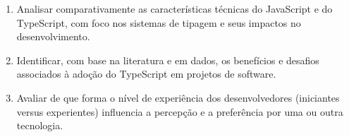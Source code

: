 \begin{enumerate}
    \item Analisar comparativamente as características técnicas do JavaScript e do TypeScript, com foco nos sistemas de tipagem e seus impactos no desenvolvimento.
    \item Identificar, com base na literatura e em dados, os benefícios e desafios associados à adoção do TypeScript em projetos de software.
    \item Avaliar de que forma o nível de experiência dos desenvolvedores (iniciantes versus experientes) influencia a percepção e a preferência por uma ou outra tecnologia.
\end{enumerate}